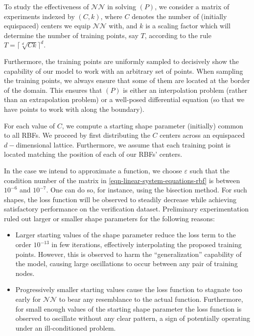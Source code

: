 \documentclass[12pt]{report} %
\begin{document}
To study the effectiveness of $\mathcal{NN}$ in solving $(P)$, we consider a matrix of experiments indexed by $(C,k)$, where $C$ denotes the number of (initially equispaced) centers we equip $\mathcal{NN}$ with, and $k$ is a scaling factor which will determine the number of training points, say $T$, according to the rule
$T = \lceil \sqrt[d]{C  k} \rceil ^d $.

Furthermore, the training points are uniformly sampled to decisively show the capability of our model to work with an arbitrary set of points. When sampling the training points, we always ensure that some of them are located at the border of the domain. This ensures that $(P)$ is either an interpolation problem (rather than an extrapolation problem) or a well-posed differential equation (so that we have points to work with along the boundary).

For each value of $C$, we compute a starting shape parameter (initially) common to all RBFs. We proceed by first distributing the $C$ centers across an equispaced $d-$dimensional lattice. Furthermore, we assume that each training point is located matching the position of each of our RBFs' centers.

In the case we intend to approximate a function, we choose $\varepsilon$ such that the condition number of the matrix in \eqref{eqn-linear-system-equations-rbf} is between $10^{-6}$ and $10^{-7}$. One can do so, for instance, using the bisection method. For such shapes, the loss function will be observed to steadily decrease while achieving satisfactory performance on the verification dataset. Preliminary experimentation ruled out larger or smaller shape parameters for the following reasons:
\begin{itemize}
  \item Larger starting values of the shape parameter reduce the loss term to the order $10^{-13}$ in few iterations, effectively interpolating the proposed training points. However, this is observed to harm the ``generalization'' capability of the model, causing large oscillations to occur between any pair of training nodes.
  \item Progressively smaller starting values cause the loss function to stagnate too early for $\mathcal{NN}$ to bear any resemblance to the actual function. Furthermore, for small enough values of the starting shape parameter the loss function is observed to oscillate without any clear pattern, a sign of potentially operating under an ill-conditioned problem. 
\end{itemize}
\end{document}
